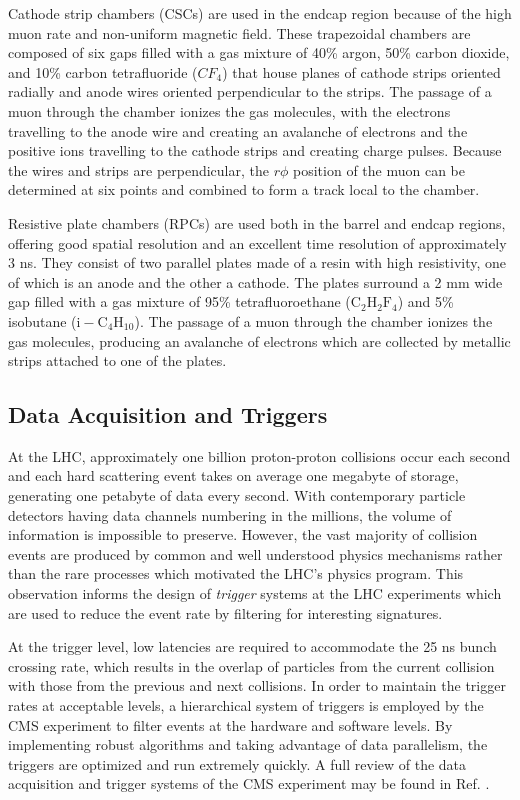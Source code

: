Cathode strip chambers (CSCs) are used in the endcap region because of the high muon rate and non-uniform magnetic field. These trapezoidal chambers are composed of six gaps filled with a gas mixture of 40\% argon, 50\% carbon dioxide, and 10\% carbon tetrafluoride ($CF_{4}$) that house planes of cathode strips oriented radially and anode wires oriented perpendicular to the strips. The passage of a muon through the chamber ionizes the gas molecules, with the electrons travelling to the anode wire and creating an avalanche of electrons and the positive ions travelling to the cathode strips and creating charge pulses. Because the wires and strips are perpendicular, the $r\phi$ position of the muon can be determined at six points and combined to form a track local to the chamber.

Resistive plate chambers (RPCs) are used both in the barrel and endcap regions, offering good spatial resolution and an excellent time resolution of approximately 3 ns. They consist of two parallel plates made of a resin with high resistivity, one of which is an anode and the other a cathode. The plates surround a 2 mm wide gap filled with a gas mixture of 95\% tetrafluoroethane ($\mathrm{C_{2}H_{2}F_{4}}$) and 5\% isobutane ($\mathrm{i-C_{4}H_{10}}$). The passage of a muon through the chamber ionizes the gas molecules, producing an avalanche of electrons which are collected by metallic strips attached to one of the plates.

\subsection{Data Acquisition and Triggers}

At the LHC, approximately one billion proton-proton collisions occur each second and each hard scattering event takes on average one megabyte of storage, generating one petabyte of data every second. With contemporary particle detectors having data channels numbering in the millions, the volume of information is impossible to preserve. However, the vast majority of collision events are produced by common and well understood physics mechanisms rather than the rare processes which motivated the LHC's physics program. This observation informs the design of \textit{trigger} systems at the LHC experiments which are used to reduce the event rate by filtering for interesting signatures.

At the trigger level, low latencies are required to accommodate the 25 ns bunch crossing rate, which results in the overlap of particles from the current collision with those from the previous and next collisions. In order to maintain the trigger rates at acceptable levels, a hierarchical system of triggers is employed by the CMS experiment to filter events at the hardware and software levels. By implementing robust algorithms and taking advantage of data parallelism, the triggers are optimized and run extremely quickly. A full review of the data acquisition and trigger systems of the CMS experiment may be found in Ref. \cite{CMSTRIDAS}.

